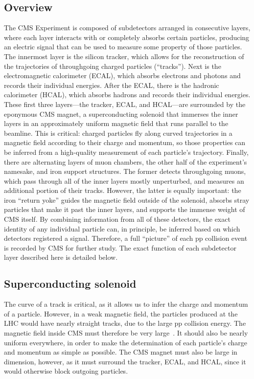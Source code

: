 \subsection{Overview}
The CMS Experiment is composed of subdetectors arranged in consecutive layers, where each layer interacts with or completely absorbs certain particles, producing an electric signal that can be used to measure some property of those particles. 
The innermost layer is the silicon tracker, which allows for the reconstruction of the trajectories of throughgoing charged particles (``tracks''). 
Next is the electromagnetic calorimeter (ECAL), which absorbs electrons and photons and records their individual energies. 
After the ECAL, there is the hadronic calorimeter (HCAL), which absorbs hadrons and records their individual energies. 
These first three layers---the tracker, ECAL, and HCAL---are surrounded by the eponymous CMS magnet, a superconducting solenoid that immerses the inner layers in an approximately uniform magnetic field that runs parallel to the beamline. 
This is critical: charged particles fly along curved trajectories in a magnetic field according to their charge and momentum, so those properties can be inferred from a high-quality measurement of each particle's trajectory. 
Finally, there are alternating layers of muon chambers, the other half of the experiment's namesake, and iron support structures. 
The former detects throughgoing muons, which pass through all of the inner layers mostly unperturbed, and measures an additional portion of their tracks.
However, the latter is equally important: the iron ``return yoke'' guides the magnetic field outside of the solenoid, absorbs stray particles that make it past the inner layers, and supports the immense weight of CMS itself. 
By combining information from all of these detectors, the exact identity of any individual particle can, in principle, be inferred based on which detectors registered a signal. 
Therefore, a full ``picture'' of each pp collision event is recorded by CMS for further study. 
The exact function of each subdetector layer described here is detailed below.

\subsection{Superconducting solenoid}
The curve of a track is critical, as it allows us to infer the charge and momentum of a particle. 
However, in a weak magnetic field, the particles produced at the LHC would have nearly straight tracks, due to the large pp collision energy. 
The magnetic field inside CMS must therefore be very large~\cite{CMSWebMagnet}. 
It should also be nearly uniform everywhere, in order to make the determination of each particle's charge and momentum as simple as possible. 
The CMS magnet must also be large in dimension, however, as it must surround the tracker, ECAL, and HCAL, since it would otherwise block outgoing particles. 


